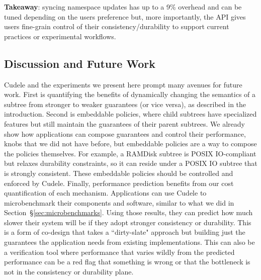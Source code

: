 \textbf{Takeaway}: syncing namespace updates has up to a 9\% overhead and can
be tuned depending on the users preference but, more importantly, the API gives
users fine-grain control of their consistency/durability to support current
practices or experimental workflows.

%
%

\subsection{Discussion and Future Work}

Cudele and the experiments we present here prompt many avenues for future work.
First is quantifying the benefits of dynamically changing the semantics of a
subtree from stronger to weaker guarantees (or vice versa), as described in the
introduction. Second is embeddable policies, where child subtrees have
specialized features but still maintain the guarantees  of their parent
subtrees. We already show how applications can compose guarantees and control
their performance, knobs that we did not have before, but embeddable policies
are a way to compose the policies themselves.  For example, a RAMDisk subtree
is POSIX IO-compliant but relaxes durability constraints, so it can reside
under a POSIX IO subtree that is strongly consistent. These embeddable policies
should be controlled and enforced by Cudele.  Finally, performance prediction
benefits from our cost quantification of each mechanism. Applications can use
Cudele to microbenchmark their components and software, similar to what we did
in Section~\S\ref{sec:microbenchmarks}. Using those results, they can predict
how much slower their system will be if they adopt stronger consistency or
durability.  This is a form of co-design that takes a ``dirty-slate" approach
but building just the guarantees the application needs from existing
implementations.  This can also be a verification tool where performance that
varies wildly from the predicted performance can be a red flag that something
is wrong or that the bottleneck is not in the consistency or durability plane.

